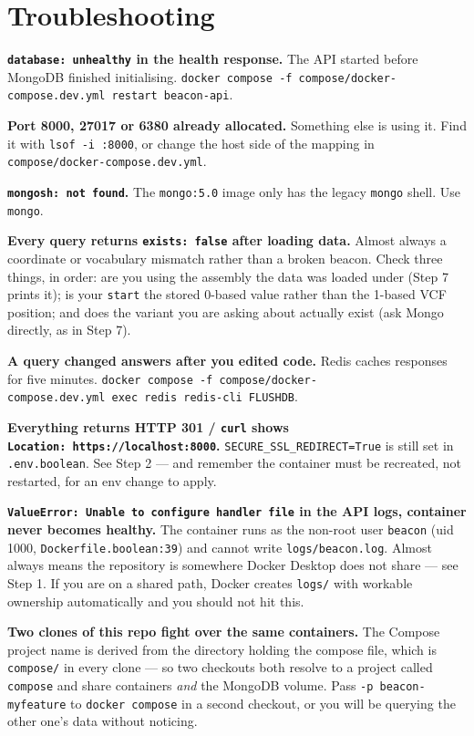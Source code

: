 \documentclass[
  10pt,
]{article}
\begin{document}
\section{Troubleshooting}\label{troubleshooting}

\textbf{\texttt{database:\ unhealthy} in the health response.} The API
started before MongoDB finished initialising.
\texttt{docker\ compose\ -f\ compose/docker-compose.dev.yml\ restart\ beacon-api}.

\textbf{Port 8000, 27017 or 6380 already allocated.} Something else is
using it. Find it with \texttt{lsof\ -i\ :8000}, or change the host side
of the mapping in \texttt{compose/docker-compose.dev.yml}.

\textbf{\texttt{mongosh:\ not\ found}.} The \texttt{mongo:5.0} image
only has the legacy \texttt{mongo} shell. Use \texttt{mongo}.

\textbf{Every query returns \texttt{exists:\ false} after loading data.}
Almost always a coordinate or vocabulary mismatch rather than a broken
beacon. Check three things, in order: are you using the assembly the
data was loaded under (Step 7 prints it); is your \texttt{start} the
stored 0-based value rather than the 1-based VCF position; and does the
variant you are asking about actually exist (ask Mongo directly, as in
Step 7).

\textbf{A query changed answers after you edited code.} Redis caches
responses for five minutes.
\texttt{docker\ compose\ -f\ compose/docker-compose.dev.yml\ exec\ redis\ redis-cli\ FLUSHDB}.

\textbf{Everything returns HTTP 301 / \texttt{curl} shows
\texttt{Location:\ https://localhost:8000}.}
\texttt{SECURE\_SSL\_REDIRECT=True} is still set in
\texttt{.env.boolean}. See Step 2 --- and remember the container must be
recreated, not restarted, for an env change to apply.

\textbf{\texttt{ValueError:\ Unable\ to\ configure\ handler\ \textquotesingle{}file\textquotesingle{}}
in the API logs, container never becomes healthy.} The container runs as
the non-root user \texttt{beacon} (uid 1000,
\texttt{Dockerfile.boolean:39}) and cannot write
\texttt{logs/beacon.log}. Almost always means the repository is
somewhere Docker Desktop does not share --- see Step 1. If you are on a
shared path, Docker creates \texttt{logs/} with workable ownership
automatically and you should not hit this.

\textbf{Two clones of this repo fight over the same containers.} The
Compose project name is derived from the directory holding the compose
file, which is \texttt{compose/} in every clone --- so two checkouts
both resolve to a project called \texttt{compose} and share containers
\emph{and} the MongoDB volume. Pass \texttt{-p\ beacon-myfeature} to
\texttt{docker\ compose} in a second checkout, or you will be querying
the other one's data without noticing.
\end{document}
